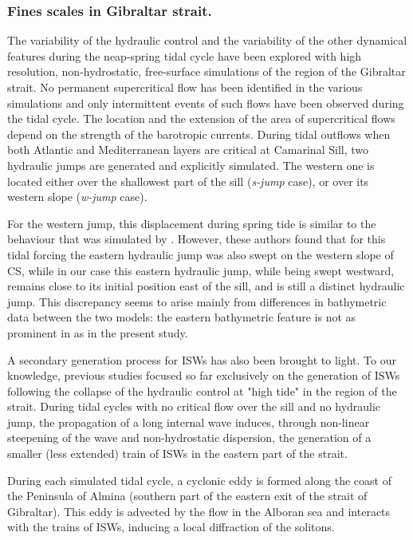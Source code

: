 \subsubsection{Fines scales in Gibraltar strait.}
The variability of the hydraulic control and the variability of the other dynamical features during the neap-spring tidal cycle have been explored with high resolution, non-hydrostatic, free-surface simulations of the region of the Gibraltar strait. No permanent supercritical flow has been identified in the various simulations and only intermittent events of such flows have been observed during the tidal cycle. The location and the extension of the area of supercritical flows depend on the strength of the barotropic currents. During tidal outflows when both Atlantic and Mediterranean layers are critical at Camarinal Sill, two hydraulic jumps are generated and explicitly simulated. The western one is located either over the shallowest part of the sill (\textit{s-jump} case), or over its western slope (\textit{w-jump} case). 

For the western jump, this displacement during spring tide is similar to the behaviour that was simulated by \citet{sanchez-garrido_2011}. However, these authors found that for this tidal forcing the eastern hydraulic jump was also swept on the western slope of CS, while in our case this eastern hydraulic jump, while being swept westward, remains close to its initial position east of the sill, and is still a distinct hydraulic jump. This discrepancy seems to arise mainly from differences in bathymetric data between the two models: the eastern bathymetric feature is not as prominent in \citet{sanchez-garrido_2011} as in the present study.

A secondary generation process for ISWs has also been brought to light. To our knowledge, previous studies focused so far exclusively on the generation of ISWs following the collapse of the hydraulic control at "high tide" in the region of the strait. During tidal cycles with no critical flow over the sill and no hydraulic jump, the propagation of a long internal wave induces, through non-linear steepening of the wave and non-hydrostatic dispersion, the generation of a smaller (less extended) train of ISWs in the eastern part of the strait.

During each simulated tidal cycle, a cyclonic eddy is formed along the coast of the Peninsula of Almina (southern part of the eastern exit of the strait of Gibraltar). This eddy is advected by the flow in the Alboran sea and interacts with the trains of ISWs, inducing a local diffraction of the solitons. 

